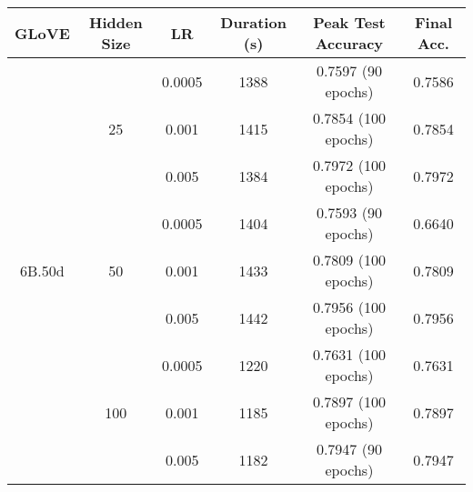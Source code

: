 \begin{table}
\begin{tabular}{@{}|c|c|cccc@{}}
\toprule
\textbf{GLoVE}            & \textbf{Hidden Size} & \textbf{LR}                 & \textbf{Duration (s)}     & \textbf{Peak Test Accuracy}                      & \textbf{Final Acc.}                  \\ \midrule
\multirow{9}{*}{6B.50d}   & \multirow{3}{*}{25}  & \multicolumn{1}{c|}{0.0005} & \multicolumn{1}{c|}{1388} & \multicolumn{1}{c|}{0.7597 (90 epochs)}          & \multicolumn{1}{c|}{0.7586}          \\ \cmidrule(l){3-6} 
                          &                      & \multicolumn{1}{c|}{0.001}  & \multicolumn{1}{c|}{1415} & \multicolumn{1}{c|}{0.7854 (100 epochs)}         & \multicolumn{1}{c|}{0.7854}          \\ \cmidrule(l){3-6} 
                          &                      & \multicolumn{1}{c|}{0.005}  & \multicolumn{1}{c|}{1384} & \multicolumn{1}{c|}{0.7972 (100 epochs)}         & \multicolumn{1}{c|}{0.7972}          \\ \cmidrule(l){2-6} 
                          & \multirow{3}{*}{50}  & \multicolumn{1}{c|}{0.0005} & \multicolumn{1}{c|}{1404} & \multicolumn{1}{c|}{0.7593 (90 epochs)}          & \multicolumn{1}{c|}{0.6640}          \\ \cmidrule(l){3-6} 
                          &                      & \multicolumn{1}{c|}{0.001}  & \multicolumn{1}{c|}{1433} & \multicolumn{1}{c|}{0.7809 (100 epochs)}         & \multicolumn{1}{c|}{0.7809}          \\ \cmidrule(l){3-6} 
                          &                      & \multicolumn{1}{c|}{0.005}  & \multicolumn{1}{c|}{1442} & \multicolumn{1}{c|}{0.7956 (100 epochs)}         & \multicolumn{1}{c|}{0.7956}          \\ \cmidrule(l){2-6} 
                          & \multirow{3}{*}{100} & \multicolumn{1}{c|}{0.0005} & \multicolumn{1}{c|}{1220} & \multicolumn{1}{c|}{0.7631 (100 epochs)}         & \multicolumn{1}{c|}{0.7631}          \\ \cmidrule(l){3-6} 
                          &                      & \multicolumn{1}{c|}{0.001}  & \multicolumn{1}{c|}{1185} & \multicolumn{1}{c|}{0.7897 (100 epochs)}         & \multicolumn{1}{c|}{0.7897}          \\ \cmidrule(l){3-6} 
                          &                      & \multicolumn{1}{c|}{0.005}  & \multicolumn{1}{c|}{1182} & \multicolumn{1}{c|}{0.7947 (90 epochs)}          & \multicolumn{1}{c|}{0.7947}          \\ \midrule

\end{tabular}
\end{table}

